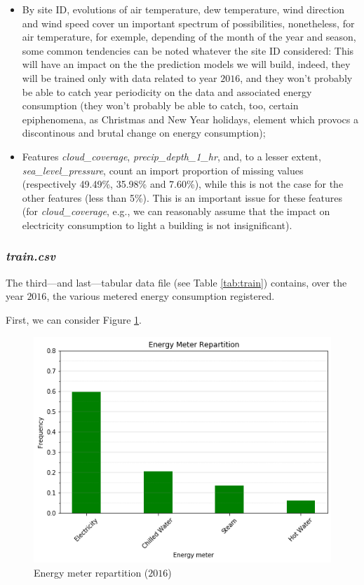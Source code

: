 \documentclass[twocolumn, switch]{article}
\begin{document}
\begin{itemize}
\item By site ID, evolutions of air temperature, dew temperature, wind direction and wind speed cover un important spectrum of possibilities, nonetheless, for air temperature, for exemple, depending of the month of the year and season, some common tendencies can be noted whatever the site ID considered: This will have an impact on the the prediction models we will build, indeed, they will be trained only with data related to year $2016$, and they won't probably be able to catch year periodicity on the data and associated energy consumption (they won't probably be able to catch, too, certain epiphenomena, as Christmas and New Year holidays, element which provocs a discontinous and brutal change on energy consumption);
\item Features \textit{cloud\_coverage}, \textit{precip\_depth\_1\_hr}, and, to a lesser extent, \textit{sea\_level\_pressure}, count an import proportion of missing values (respectively 49.49\%, 35.98\% and 7.60\%), while this is not the case for the other features (less than 5\%). This is an important issue for these features (for \textit{cloud\_coverage}, e.g., we can reasonably assume that the impact on electricity consumption to light a building is not insignificant).
\end{itemize}

\subsubsection{\textit{train.csv}}

The third---and last---tabular data file (see Table \ref{tab:train}) contains, over the year $2016$, the various metered energy consumption registered.

First, we can consider Figure \ref{fig:energy_meter_repartition}.

\begin{figure}[H]
\centering
\includegraphics[scale=0.35]{../graphs/energy_meter_repartition}
\caption{Energy meter repartition ($2016$)}
\label{fig:energy_meter_repartition}
\end{figure}
\end{document}
